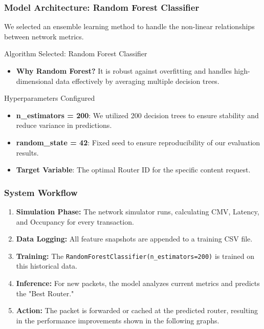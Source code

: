 \documentclass{beamer}
\begin{document}
\begin{frame}
  \frametitle{Model Architecture: Random Forest Classifier}
  We selected an ensemble learning method to handle the non-linear relationships between network metrics.
  
  \begin{alertblock}{Algorithm Selected: Random Forest Classifier}
    \begin{itemize}
        \item \textbf{Why Random Forest?} It is robust against overfitting and handles high-dimensional data effectively by averaging multiple decision trees.
    \end{itemize}
  \end{alertblock}

  \begin{block}{Hyperparameters Configured}
    \begin{itemize}
        \item \textbf{n\_estimators = 200}: We utilized 200 decision trees to ensure stability and reduce variance in predictions.
        \item \textbf{random\_state = 42}: Fixed seed to ensure reproducibility of our evaluation results.
        \item \textbf{Target Variable}: The optimal Router ID for the specific content request.
    \end{itemize}
  \end{block}
\end{frame}

\begin{frame}
  \frametitle{System Workflow}
  \begin{enumerate}
      \item \textbf{Simulation Phase:} The network simulator runs, calculating CMV, Latency, and Occupancy for every transaction.
      \item \textbf{Data Logging:} All feature snapshots are appended to a training CSV file.
      \item \textbf{Training:} The \texttt{RandomForestClassifier(n\_estimators=200)} is trained on this historical data.
      \item \textbf{Inference:} For new packets, the model analyzes current metrics and predicts the "Best Router."
      \item \textbf{Action:} The packet is forwarded or cached at the predicted router, resulting in the performance improvements shown in the following graphs.
  \end{enumerate}
\end{frame}
\end{document}
